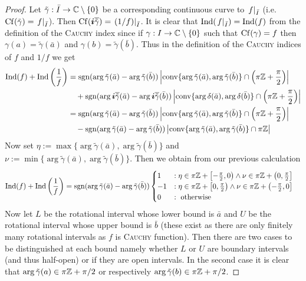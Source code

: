 \documentclass[10pt,a4paper]{article}
\begin{document}
\begin{proof}
Let $\tilde{\gamma}:\bar{I}\rightarrow\mathbb{C}\setminus\{0\}$ be a corresponding continuous curve to $\left. f\right\vert_{\bar{I}}$ (i.e. $\operatorname{Cf}(\tilde{\gamma})=\left. f\right\vert_{\bar{I}}$). Then $\operatorname{Cf}(\boldsymbol{i}\overline{\tilde{\gamma}})=\left. (1/f)\right\vert_{\bar{I}}$. It is clear that $\operatorname{Ind}(\left. f\right\vert_{\bar{I}})=\operatorname{Ind}(f)$ from the definition of the \textsc{Cauchy} index since if $\gamma:I\rightarrow\mathbb{C}\setminus\{0\}$ such that $\operatorname{Cf}(\gamma)=f$ then $\gamma(a)=\tilde{\gamma}(\bar{a})$ and $\gamma(b)=\tilde{\gamma}(\bar{b})$. 
Thus in the definition of the \textsc{Cauchy} indices of $f$ and $1/f$ we get
\begin{align}
\operatorname{Ind}(f)+\operatorname{Ind}\left(\frac{1}{f}\right) & =\operatorname{sgn}(\arg{\tilde{\gamma}(\bar{a})}-\arg{\tilde{\gamma}(\bar{b})})\left|\operatorname{conv}\{\arg{\tilde{\gamma}(\bar{a})},\arg{\tilde{\gamma}(\bar{b})}\}\cap\left(\pi\mathbb{Z}+\frac{\pi}{2}\right)\right|\\
& \quad+\operatorname{sgn}(\arg{\boldsymbol{i}\overline{\tilde{\gamma}}(\bar{a})}-\arg{\boldsymbol{i}\overline{\tilde{\gamma}}(\bar{b})})\left|\operatorname{conv}\{\arg{\delta(\bar{a})},\arg{\delta(\bar{b})}\}\cap\left(\pi\mathbb{Z}+\frac{\pi}{2}\right)\right|\\
& = \operatorname{sgn}(\arg{\tilde{\gamma}(\bar{a})}-\arg{\tilde{\gamma}(\bar{b})})\left|\operatorname{conv}\{\arg{\tilde{\gamma}(\bar{a})},\arg{\tilde{\gamma}(\bar{b})}\}\cap\left(\pi\mathbb{Z}+\frac{\pi}{2}\right)\right|\\
& \quad -\operatorname{sgn}(\arg{\tilde{\gamma}(\bar{a})}-\arg{\tilde{\gamma}(\bar{b})})\left|\operatorname{conv}\{\arg{\tilde{\gamma}(\bar{a})},\arg{\tilde{\gamma}(\bar{b})}\}\cap\pi\mathbb{Z}\right|
\end{align}
Now set $\eta:=\max\{\arg{\tilde{\gamma}(\bar{a})},\arg{\tilde{\gamma}(\bar{b})}\}$ and $\nu:=\min\{\arg{\tilde{\gamma}(\bar{a})},\arg{\tilde{\gamma}(\bar{b})}\}$. Then we obtain from our previous calculation
\begin{align}
\operatorname{Ind}(f)+\operatorname{Ind}\left(\frac{1}{f}\right) & = \operatorname{sgn}(\arg{\tilde{\gamma}(\bar{a})}-\arg{\tilde{\gamma}(\bar{b})})\begin{cases}
1 	&: \eta\in\pi\mathbb{Z}+\left[-\frac{\pi}{2},0\right)\wedge\nu\in\pi\mathbb{Z}+\left(0,\frac{\pi}{2}\right]\\
-1 	&: \eta\in\pi\mathbb{Z}+\left[0,\frac{\pi}{2}\right)\wedge\nu\in\pi\mathbb{Z}+\left(-\frac{\pi}{2},0\right]\\
0	&: \text{ otherwise }
\end{cases}
\end{align}
Now let $L$ be the rotational interval whose lower bound is $\bar{a}$ and $U$ be the rotational interval whose upper bound is $\bar{b}$ (these exist as there are only finitely many rotational intervals as $f$ is \textsc{Cauchy} function). Then there are two cases to be distinguished at each bound namely whether $L$ or $U$ are boundary intervals (and thus half-open) or if they are open intervals. In the second case it is clear that $\arg{\tilde{\gamma}(a)}\in\pi\mathbb{Z}+\pi/2$ or respectively $\arg{\tilde{\gamma}(b)}\in\pi\mathbb{Z}+\pi/2$.

\end{proof}
\end{document}
